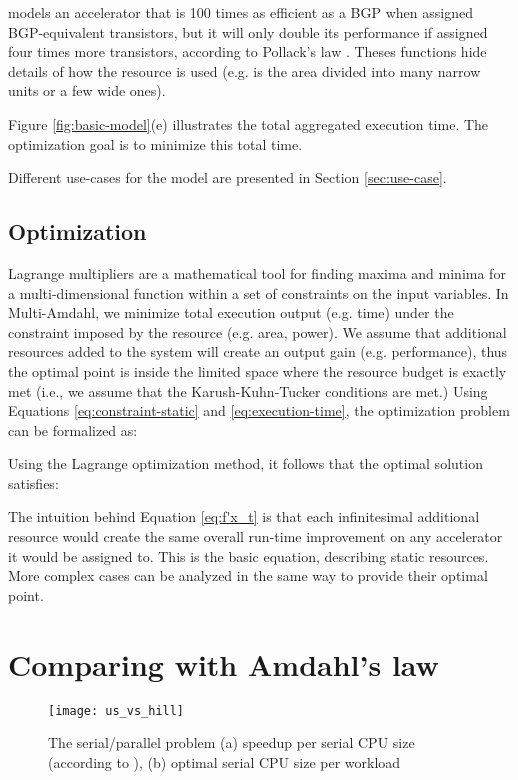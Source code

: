\documentclass[twocolumn,english]{IEEEtran}
\begin{document}
models an accelerator that is 100 times as efficient as a BGP when
assigned BGP-equivalent transistors, but it will only double its performance
if assigned four times more transistors, according to Pollack\textquoteright{}s
law \cite{Newmicroarchi}. Theses functions hide details of how the
resource is used (e.g. is the area divided into many narrow units
or a few wide ones). 

Figure \ref{fig:basic-model}(e) illustrates the total aggregated
execution time. The optimization goal is to minimize this total time.


Different use-cases for the model are presented in Section \ref{sec:use-case}.


\subsection{Optimization}

Lagrange multipliers are a mathematical tool for finding maxima and
minima for a multi-dimensional function within a set of constraints
on the input variables. In Multi-Amdahl, we minimize total execution
output (e.g. time) under the constraint imposed by the resource (e.g.
area, power). We assume that additional resources added to the system
will create an output gain (e.g. performance), thus the optimal point
is inside the limited space where the resource budget is exactly met
(i.e., we assume that the Karush-Kuhn-Tucker conditions \cite{NonlinearProgramming}
are met.) Using Equations \eqref{eq:constraint-static} and \eqref{eq:execution-time},
the optimization problem can be formalized as:




Using the Lagrange optimization method, it follows that the optimal
solution satisfies:






The intuition behind Equation \eqref{eq:f'x_t} is that each infinitesimal
additional resource would create the same overall run-time improvement
on any accelerator it would be assigned to. This is the basic equation,
describing static resources. More complex cases can be analyzed in
the same way to provide their optimal point.


\section{\label{sec:Comparing}Comparing with Amdahl's law}

\begin{figure}[t]
\texttt{[image: us\_vs\_hill]}

\caption{\label{fig:us_vs_hill}The serial/parallel problem (a) speedup per
serial CPU size (according to \cite{hill2008amdahl}), (b) optimal
serial CPU size per workload}
\end{figure}
\end{document}
